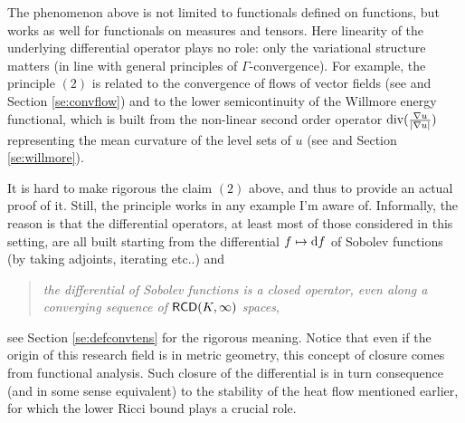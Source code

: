 \documentclass[11pt]{article}
\numberwithin{equation}{section}
\newcommand{\RCD}{{\sf RCD}}
\renewcommand{\d}{{\rm d}}
\renewcommand{\div}{{\rm div}}
\begin{document}
The phenomenon above is not limited to functionals defined on functions, but works as well for functionals on measures and tensors. Here linearity of the underlying differential operator plays no role: only the variational structure matters (in line with  general principles of $\Gamma$-convergence). For example, the principle $(2)$  is related to the convergence of flows of vector fields (see \cite{AST17} and Section \ref{se:convflow}) and to the lower semicontinuity of the Willmore energy functional, which is built from the non-linear second order operator $\div(\tfrac{\nabla u}{|\nabla u|})$ representing the mean curvature of the level sets of $u$ (see \cite{GV23} and Section \ref{se:willmore}).

It is hard to make rigorous the claim $(2)$ above, and thus to provide an actual proof of it. Still, the principle works in any example I'm aware of. Informally, the reason is that the differential operators, at least most of those considered in this setting, are all built starting from the differential $f\mapsto \d f$ of Sobolev functions (by taking adjoints, iterating etc..) and 
\begin{quote}
\emph{the differential of Sobolev functions is a closed operator, even along a converging sequence of $\RCD(K,\infty)$ spaces},
\end{quote} 
see Section \ref{se:defconvtens} for the rigorous meaning. Notice that even if the origin of this research field is in metric geometry, this concept of closure comes from functional analysis.  Such closure of the differential is in turn consequence (and in some sense equivalent) to the stability of the heat flow  mentioned earlier, for which the lower Ricci bound plays a crucial role.
\end{document}
